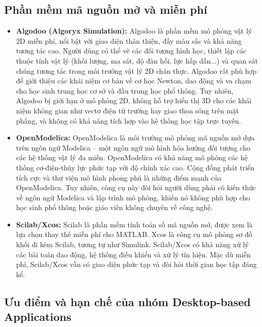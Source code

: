 \subsection{Phần mềm mã nguồn mở và miễn phí}

\begin{itemize}
    \item \textbf{Algodoo (Algoryx Simulation):} Algodoo là phần mềm mô phỏng vật lý 2D miễn phí, nổi bật với giao diện thân thiện, đầy màu sắc và khả năng tương tác cao. Người dùng có thể vẽ các đối tượng hình học, thiết lập các thuộc tính vật lý (khối lượng, ma sát, độ đàn hồi, lực hấp dẫn...) và quan sát chúng tương tác trong môi trường vật lý 2D chân thực. Algodoo rất phù hợp để giới thiệu các khái niệm cơ bản về cơ học Newton, dao động và va chạm cho học sinh trung học cơ sở và đầu trung học phổ thông. Tuy nhiên, Algodoo bị giới hạn ở mô phỏng 2D, không hỗ trợ hiển thị 3D cho các khái niệm không gian như vectơ điện từ trường hay giao thoa sóng trên mặt phẳng, và không có khả năng tích hợp vào hệ thống học tập trực tuyến.
    
    \item \textbf{OpenModelica:} OpenModelica là môi trường mô phỏng mã nguồn mở dựa trên ngôn ngữ Modelica – một ngôn ngữ mô hình hóa hướng đối tượng cho các hệ thống vật lý đa miền. OpenModelica có khả năng mô phỏng các hệ thống cơ-điện-thủy lực phức tạp với độ chính xác cao. Cộng đồng phát triển tích cực và thư viện mô hình phong phú là những điểm mạnh của OpenModelica. Tuy nhiên, công cụ này đòi hỏi người dùng phải có kiến thức về ngôn ngữ Modelica và lập trình mô phỏng, khiến nó không phù hợp cho học sinh phổ thông hoặc giáo viên không chuyên về công nghệ.
    
    \item \textbf{Scilab/Xcos:} Scilab là phần mềm tính toán số mã nguồn mở, được xem là lựa chọn thay thế miễn phí cho MATLAB. Xcos là công cụ mô phỏng sơ đồ khối đi kèm Scilab, tương tự như Simulink. Scilab/Xcos có khả năng xử lý các bài toán dao động, hệ thống điều khiển và xử lý tín hiệu. Mặc dù miễn phí, Scilab/Xcos vẫn có giao diện phức tạp và đòi hỏi thời gian học tập đáng kể.
\end{itemize}

\subsection{Ưu điểm và hạn chế của nhóm Desktop-based Applications}

